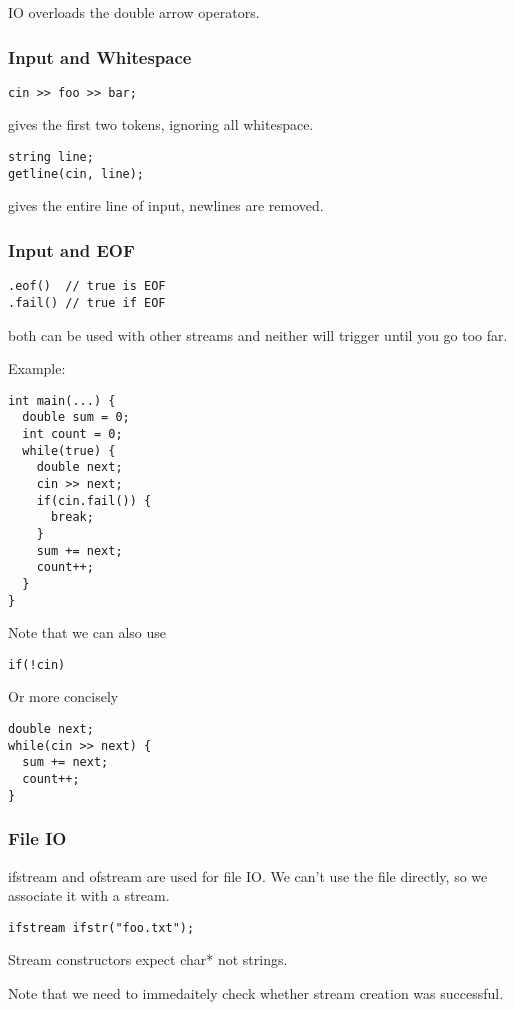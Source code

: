 \documentclass[12pt]{article}
\begin{document}
IO overloads the double arrow operators.

\subsubsection*{Input and Whitespace}
\begin{verbatim}
cin >> foo >> bar;
\end{verbatim}
gives the first two tokens, ignoring all whitespace.

\begin{verbatim}
string line;
getline(cin, line);
\end{verbatim}
gives the entire line of input, newlines are removed.

\subsubsection*{Input and EOF}
\begin{verbatim}
.eof()  // true is EOF
.fail() // true if EOF
\end{verbatim}
both can be used with other streams and neither will trigger until you go too far.

Example:
\begin{verbatim}
int main(...) {
  double sum = 0;
  int count = 0;
  while(true) {
    double next;
    cin >> next;
    if(cin.fail()) {
      break;
    }
    sum += next;
    count++;
  }
}
\end{verbatim}

Note that we can also use
\begin{verbatim}
if(!cin)
\end{verbatim}

Or more concisely
\begin{verbatim}
double next;
while(cin >> next) {
  sum += next;
  count++;
}
\end{verbatim}

\subsubsection*{File IO}
ifstream and ofstream are used for file IO. We can't use the file directly, so we associate it with a stream.

\begin{verbatim}
ifstream ifstr("foo.txt");
\end{verbatim}

Stream constructors expect char* not strings.

Note that we need to immedaitely check whether stream creation was successful.
\end{document}
